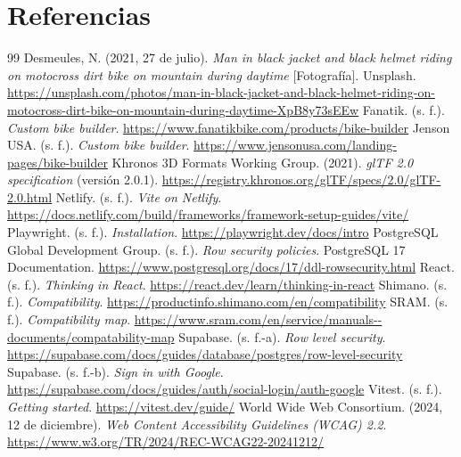 \documentclass[12pt,letterpaper]{article}
\newcommand{\pagina}{\clearpage}
\begin{document}

\pagina

\section*{Referencias}
\renewcommand{\bibsection}{}
\begingroup
\normalsize\doublespacing
\renewcommand{\bibfont}{\normalsize\doublespacing}
\setlength{\bibhang}{1.27cm}
\setlength{\bibsep}{0pt}
\begin{thebibliography}{99}
 Desmeules, N. (2021, 27 de julio). \textit{Man in black jacket and black helmet riding on motocross dirt bike on mountain during daytime} [Fotografía]. Unsplash. \url{https://unsplash.com/photos/man-in-black-jacket-and-black-helmet-riding-on-motocross-dirt-bike-on-mountain-during-daytime-XpB8y73sEEw}
 Fanatik. (s. f.). \textit{Custom bike builder}. \url{https://www.fanatikbike.com/products/bike-builder}
 Jenson USA. (s. f.). \textit{Custom bike builder}. \url{https://www.jensonusa.com/landing-pages/bike-builder}
 Khronos 3D Formats Working Group. (2021). \textit{glTF 2.0 specification} (versión 2.0.1). \url{https://registry.khronos.org/glTF/specs/2.0/glTF-2.0.html}
 Netlify. (s. f.). \textit{Vite on Netlify}.  \url{https://docs.netlify.com/build/frameworks/framework-setup-guides/vite/}
 Playwright. (s. f.). \textit{Installation}.  \url{https://playwright.dev/docs/intro}
 PostgreSQL Global Development Group. (s. f.). \textit{Row security policies}. PostgreSQL 17 Documentation. \url{https://www.postgresql.org/docs/17/ddl-rowsecurity.html}
 React. (s. f.). \textit{Thinking in React}.  \url{https://react.dev/learn/thinking-in-react}
 Shimano. (s. f.). \textit{Compatibility}.  \url{https://productinfo.shimano.com/en/compatibility}
 SRAM. (s. f.). \textit{Compatibility map}.  \url{https://www.sram.com/en/service/manuals--documents/compatability-map}
 Supabase. (s. f.-a). \textit{Row level security}.  \url{https://supabase.com/docs/guides/database/postgres/row-level-security}
 Supabase. (s. f.-b). \textit{Sign in with Google}.  \url{https://supabase.com/docs/guides/auth/social-login/auth-google}
 Vitest. (s. f.). \textit{Getting started}.  \url{https://vitest.dev/guide/}
 World Wide Web Consortium. (2024, 12 de diciembre). \textit{Web Content Accessibility Guidelines (WCAG) 2.2}. \url{https://www.w3.org/TR/2024/REC-WCAG22-20241212/}
\end{thebibliography}
\endgroup
\end{document}

